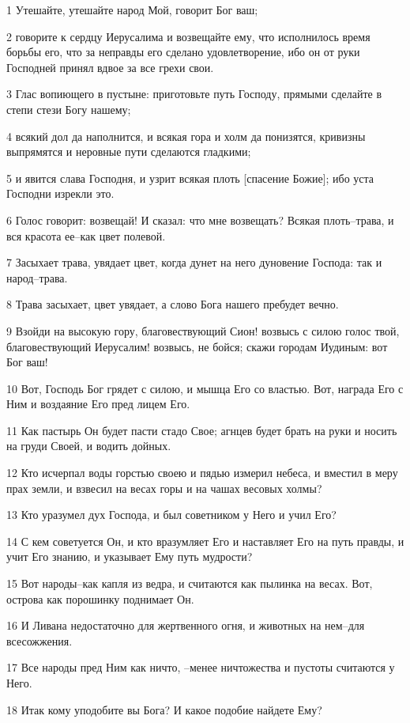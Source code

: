 \par 1 Утешайте, утешайте народ Мой, говорит Бог ваш;
\par 2 говорите к сердцу Иерусалима и возвещайте ему, что исполнилось время борьбы его, что за неправды его сделано удовлетворение, ибо он от руки Господней принял вдвое за все грехи свои.
\par 3 Глас вопиющего в пустыне: приготовьте путь Господу, прямыми сделайте в степи стези Богу нашему;
\par 4 всякий дол да наполнится, и всякая гора и холм да понизятся, кривизны выпрямятся и неровные пути сделаются гладкими;
\par 5 и явится слава Господня, и узрит всякая плоть [спасение Божие]; ибо уста Господни изрекли это.
\par 6 Голос говорит: возвещай! И сказал: что мне возвещать? Всякая плоть--трава, и вся красота ее--как цвет полевой.
\par 7 Засыхает трава, увядает цвет, когда дунет на него дуновение Господа: так и народ--трава.
\par 8 Трава засыхает, цвет увядает, а слово Бога нашего пребудет вечно.
\par 9 Взойди на высокую гору, благовествующий Сион! возвысь с силою голос твой, благовествующий Иерусалим! возвысь, не бойся; скажи городам Иудиным: вот Бог ваш!
\par 10 Вот, Господь Бог грядет с силою, и мышца Его со властью. Вот, награда Его с Ним и воздаяние Его пред лицем Его.
\par 11 Как пастырь Он будет пасти стадо Свое; агнцев будет брать на руки и носить на груди Своей, и водить дойных.
\par 12 Кто исчерпал воды горстью своею и пядью измерил небеса, и вместил в меру прах земли, и взвесил на весах горы и на чашах весовых холмы?
\par 13 Кто уразумел дух Господа, и был советником у Него и учил Его?
\par 14 С кем советуется Он, и кто вразумляет Его и наставляет Его на путь правды, и учит Его знанию, и указывает Ему путь мудрости?
\par 15 Вот народы--как капля из ведра, и считаются как пылинка на весах. Вот, острова как порошинку поднимает Он.
\par 16 И Ливана недостаточно для жертвенного огня, и животных на нем--для всесожжения.
\par 17 Все народы пред Ним как ничто, --менее ничтожества и пустоты считаются у Него.
\par 18 Итак кому уподобите вы Бога? И какое подобие найдете Ему?
